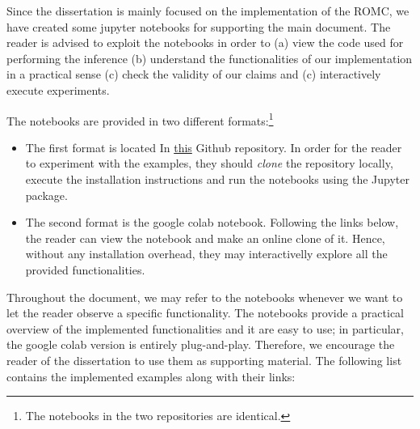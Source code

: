 Since the dissertation is mainly focused on the implementation of the
ROMC, we have created some jupyter notebooks for supporting the main
document. The reader is advised to exploit the notebooks in order to
(a) view the code used for performing the inference (b)
understand the functionalities of our implementation in a practical
sense (c) check the validity of our claims and (c) interactively
execute experiments.

The notebooks are provided in two different formats:\footnote{The
  notebooks in the two repositories are identical.}

\begin{itemize}
\item The first format is located In
  \href{https://github.com/givasile/edinburgh-thesis/tree/master/notebook_examples}{this}
  Github repository. In order for the reader to experiment with the
  examples, they should \textit{clone} the repository locally, execute
  the installation instructions and run the notebooks using the
  Jupyter package.
\item The second format is the google colab notebook. Following the
  links below, the reader can view the notebook and make an online
  clone of it. Hence, without any installation overhead, they may
  interactivelly explore all the provided functionalities.
\end{itemize}


Throughout the document, we may refer to the notebooks whenever we
want to let the reader observe a specific functionality. The notebooks
provide a practical overview of the implemented functionalities and it
are easy to use; in particular, the google colab version is entirely
plug-and-play. Therefore, we encourage the reader of the dissertation
to use them as supporting material.  The following list contains the
implemented examples along with their links:


